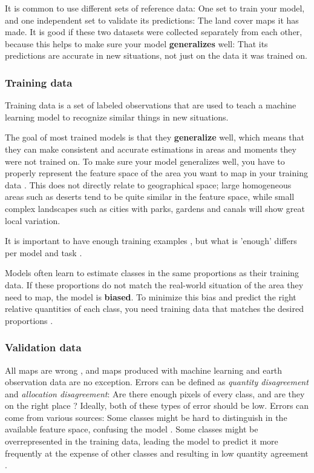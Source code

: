     It is common to use different sets of reference data: One set to train your model, and one independent set to validate its predictions: The land cover maps it has made. It is good if these two datasets were collected separately from each other, because this helps to make sure your model \textbf{generalizes} well: That its predictions are accurate in new situations, not just on the data it was trained on.

    \subsubsection*{Training data}

        Training data is a set of labeled observations that are used to teach a machine learning model to recognize similar things in new situations. 
        
        The goal of most trained models is that they \textbf{generalize} well, which means that they can make consistent and accurate estimations in areas and moments they were not trained on. To make sure your model generalizes well, you have to properly represent the feature space of the area you want to map in your training data \citep{meyer2021predicting}. This does not directly relate to geographical space; large homogeneous areas such as deserts tend to be quite similar in the feature space, while small complex landscapes such as cities with parks, gardens and canals will show great local variation. 

        It is important to have enough training examples \citep{ramezan2021effects,rodriguez-perez2017influence,zhu2016optimizing}, but what is 'enough' differs per model  \citep{myburgh2014impact} and task \citep{koshute2021recommending}.
        
        Models often learn to estimate classes in the same proportions as their training data. If these proportions do not match the real-world situation of the area they need to map, the model is \textbf{biased}. To minimize this bias and predict the right relative quantities of each class, you need training data that matches the desired proportions \citep{he2009learning, kleinewillinghofer2022unbiased}.
        
    \subsubsection*{Validation data}

        All maps are wrong \citep{monmonier2018how}, and maps produced with machine learning and earth observation data are no exception. Errors can be defined as \textit{quantity disagreement} and \textit{allocation disagreement}: Are there enough pixels of every class, and are they on the right place \citep{pontius2006can,pontius2011death}? Ideally, both of these types of error should be low. Errors can come from various sources: Some classes might be hard to distinguish in the available feature space, confusing the model \citep{shivakumar2017spectral}. Some classes might be overrepresented in the training data, leading the model to predict it more frequently at the expense of other classes and resulting in low quantity agreement .

